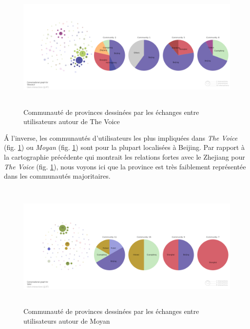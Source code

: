 \begin{figure}[h!]
    \centering
    \includegraphics[width=5.9996in,height=2.5004in]{figures/chap4/chapitre4-img56.png}
    \caption{
        Communaut\'e de provinces dessin\'ees par les \'echanges entre utilisateurs autour de The Voice
    }
    \label{fig:voice-users-pie}
\end{figure}

\'A l{\textquoteright}inverse, les communaut\'es d{\textquoteright}utilisateurs les plus impliqu\'ees dans \textit{The Voice } (fig. \ref{fig:voice-users-pie}) ou \textit{Moyan} (fig. \ref{fig:voice-users-pie}) sont pour la plupart localis\'ees \`a Beijing. Par rapport \`a la cartographie pr\'ec\'edente qui montrait les relations fortes avec le Zhejiang pour \textit{The Voice} (fig. \ref{fig:voice-users-pie}), nous voyons ici que la province est tr\`es faiblement repr\'esent\'ee dans les communaut\'es majoritaires. 

\begin{figure}[h!]
  \centering
   \includegraphics[width=5.9996in,height=2.5004in]{figures/chap4/chapitre4-img57.png}
    \caption{
        Communaut\'e de provinces dessin\'ees par les \'echanges entre utilisateurs autour de Moyan
    }
    \label{fig:moyan-users-pie}
\end{figure}

